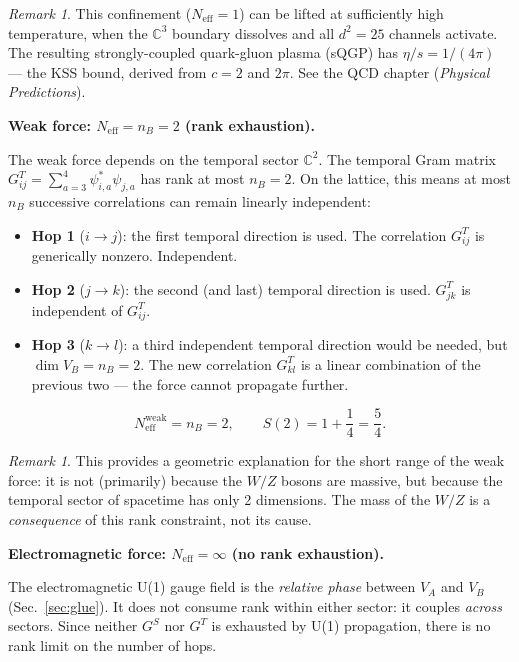 \documentclass[12pt]{article}
\theoremstyle{remark}
\newtheorem{remark}[theorem]{Remark}
\theoremstyle{definition}
\newcommand{\CC}{\mathbb{C}}
\begin{document}
\begin{remark}
This confinement ($N_\text{eff} = 1$) can be lifted at sufficiently high temperature, when the $\CC^3$ boundary dissolves and all $d^2 = 25$ channels activate. The resulting strongly-coupled quark-gluon plasma (sQGP) has $\eta/s = 1/(4\pi)$ --- the KSS bound, derived from $c = 2$ and $2\pi$. See the QCD chapter (\textit{Physical Predictions}).
\end{remark}

\bigskip

\noindent\textbf{Weak force: $N_\text{eff} = n_B = 2$ (rank exhaustion).}

The weak force depends on the temporal sector $\CC^2$. The temporal Gram matrix $G^T_{ij} = \sum_{a=3}^{4}\psi^*_{i,a}\psi_{j,a}$ has rank at most $n_B = 2$. On the lattice, this means at most $n_B$ successive correlations can remain linearly independent:

\begin{itemize}
\item \textbf{Hop 1} ($i \to j$): the first temporal direction is used. The correlation $G^T_{ij}$ is generically nonzero. Independent.
\item \textbf{Hop 2} ($j \to k$): the second (and last) temporal direction is used. $G^T_{jk}$ is independent of $G^T_{ij}$.
\item \textbf{Hop 3} ($k \to l$): a third independent temporal direction would be needed, but $\dim V_B = n_B = 2$. The new correlation $G^T_{kl}$ is a linear combination of the previous two --- the force cannot propagate further.
\end{itemize}

\begin{equation}
N_\text{eff}^\text{weak} = n_B = 2, \qquad S(2) = 1 + \frac{1}{4} = \frac{5}{4}.
\end{equation}

\begin{remark}
This provides a geometric explanation for the short range of the weak force: it is not (primarily) because the $W/Z$ bosons are massive, but because the temporal sector of spacetime has only 2 dimensions. The mass of the $W/Z$ is a \emph{consequence} of this rank constraint, not its cause.
\end{remark}

\bigskip

\noindent\textbf{Electromagnetic force: $N_\text{eff} = \infty$ (no rank exhaustion).}

The electromagnetic U(1) gauge field is the \emph{relative phase} between $V_A$ and $V_B$ (Sec.~\ref{sec:glue}). It does not consume rank within either sector: it couples \emph{across} sectors. Since neither $G^S$ nor $G^T$ is exhausted by U(1) propagation, there is no rank limit on the number of hops.
\end{document}

